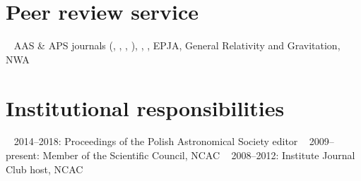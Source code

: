 \documentclass[]{friggeri-cv} %
\begin{document}




\pagebreak

\setlength{\voffset}{0pt}
\begin{aside} 
\section{Peer review service}
~ 
AAS \& APS journals ({\apj}, {\apjl}, {\prd}, {\prl}), 
{\mnras}, {\aap}, EPJA, General Relativity and Gravitation, NWA 
~
~ 
\section{Institutional responsibilities}
~
2014--2018: Proceedings of the Polish Astronomical Society editor
~
2009--present: Member of the Scientific Council, NCAC 
~
2008--2012: Institute Journal Club host, NCAC
\end{aside} 


%  
\end{document}
